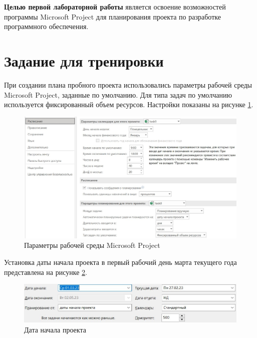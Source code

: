 \textbf{Целью первой лабораторной работы} является освоение возможностей программы Microsoft Project для планирования проекта по разработке программного обеспечения.

\section*{Задание для тренировки}

При создании плана пробного проекта использовались параметры рабочей среды Microsoft Project, заданные по умолчанию. Для типа задач по умолчанию используется фиксированный объем ресурсов. Настройки показаны на рисунке \ref{img:task0-settings}.

\begin{figure}[H]
	\begin{center}
		\includegraphics[scale=0.42]{inc/img/task0-settings.jpg}
	\end{center}
	\captionsetup{justification=centering}
	\caption{Параметры рабочей среды Microsoft Project}
	\label{img:task0-settings}
\end{figure}

Установка даты начала проекта в первый рабочий день марта текущего года представлена на рисунке \ref{img:task0-start-date}.

\begin{figure}[H]
	\begin{center}
		\includegraphics[scale=0.5]{inc/img/task0-start-date.jpg}
	\end{center}
	\captionsetup{justification=centering}
	\caption{Дата начала проекта}
	\label{img:task0-start-date}
\end{figure}

